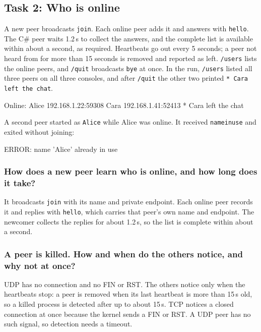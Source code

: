 \documentclass[12pt,a4paper]{article}
\begin{document}
\subsection{Task 2: Who is online}
\label{sec:task2}
A new peer broadcasts \texttt{join}. Each online peer adds it and answers with
\texttt{hello}. The C\# peer waits 1.2\,s to collect the answers, and the complete
list is available within about a second, as required. Heartbeats go out every 5
seconds; a peer not heard from for more than 15 seconds is removed and reported as
left. \texttt{/users} lists the online peers, and \texttt{/quit} broadcasts
\texttt{bye} at once. In the run, \texttt{/users} listed all three peers on all
three consoles, and after \texttt{/quit} the other two printed
\texttt{* Cara left the chat}.

\begin{terminalwindow}[]
Online:
  Alice 192.168.1.22:59308
  Cara 192.168.1.41:52413
* Cara left the chat
\end{terminalwindow}

A second peer started as \texttt{Alice} while Alice was online. It received
\texttt{nameinuse} and exited without joining:

\begin{terminalwindow}[]
ERROR: name 'Alice' already in use
\end{terminalwindow}

\subsubsection{How does a new peer learn who is online, and how long does it take?}
It broadcasts \texttt{join} with its name and private endpoint. Each online peer
records it and replies with \texttt{hello}, which carries that peer's own name and
endpoint. The newcomer collects the replies for about 1.2\,s, so the list is
complete within about a second.

\subsubsection{A peer is killed. How and when do the others notice, and why not at once?}
UDP has no connection and no FIN or RST. The others notice only when the
heartbeats stop: a peer is removed when its last heartbeat is more than 15\,s old,
so a killed process is detected after up to about 15\,s. TCP notices a closed
connection at once because the kernel sends a FIN or RST. A UDP peer has no such
signal, so detection needs a timeout.
\end{document}
